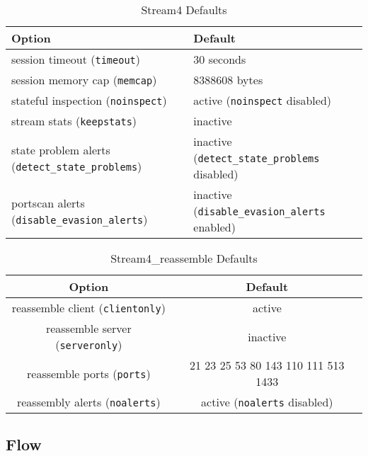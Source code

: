 \documentclass[english]{report}
\begin{document}
%
\begin{table}[!hbpt]

\caption{Stream4 Defaults\label{Stream4 Defaults}}

\begin{center}\begin{tabular}{| l | l |}
\hline 
\textbf{Option} &
\textbf{Default}\\
\hline
\hline 
session timeout (\texttt{timeout}) & 30 seconds\\
\hline 
session memory cap (\texttt{memcap}) & 8388608 bytes\\
\hline 
stateful inspection (\texttt{noinspect}) & active (\texttt{noinspect} disabled)\\
\hline 
stream stats (\texttt{keepstats}) & inactive\\
\hline 
state problem alerts (\texttt{detect\_state\_problems}) & inactive (\texttt{detect\_state\_problems} disabled)\\
\hline
portscan alerts (\texttt{disable\_evasion\_alerts})  & inactive (\texttt{disable\_evasion\_alerts} enabled)\\
\hline
\end{tabular}
\end{center}
\end{table}


%
\begin{table}[!hbpt]

\caption{Stream4\_reassemble Defaults\label{stream4 reassemble defaults}}

\begin{center}\begin{tabular}{| c | c |}
\hline 
\textbf{Option} &
\textbf{Default}\\
\hline
\hline 
reassemble client (\texttt{clientonly})&
active\\
\hline 
reassemble server (\texttt{serveronly})&
inactive\\
\hline 
reassemble ports (\texttt{ports})&
21 23 25 53 80 143 110 111 513 1433\\
\hline 
reassembly alerts (\texttt{noalerts})&
active (\texttt{noalerts} disabled)\\
\hline
\end{tabular}\end{center}
\end{table}


\subsection{Flow\label{sub:flow}}
\end{document}
